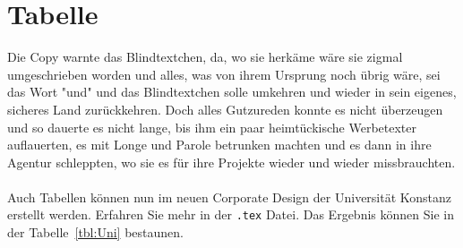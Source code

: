 \documentclass[11pt, rgb]{scrreprt}
\begin{document}

%
%
%
% 
%
% 
%
%
%
%
%
%
%
%
% 
%
%

\section{Tabelle}

Die Copy warnte das Blindtextchen, da, wo sie herkäme wäre sie zigmal umgeschrieben worden und alles, was von ihrem Ursprung noch übrig wäre, sei das Wort "und" und das Blindtextchen solle umkehren und wieder in sein eigenes, sicheres Land zurückkehren. Doch alles Gutzureden konnte es nicht überzeugen und so dauerte es nicht lange, bis ihm ein paar heimtückische Werbetexter auflauerten, es mit Longe und Parole betrunken machten und es dann in ihre Agentur schleppten, wo sie es für ihre Projekte wieder und wieder missbrauchten.\\
\\
Auch Tabellen können nun im neuen Corporate Design der Universität Konstanz erstellt werden. Erfahren Sie mehr in der \texttt{.tex} Datei. Das Ergebnis können Sie in der Tabelle~\ref{tbl:Uni} bestaunen.
\end{document}
